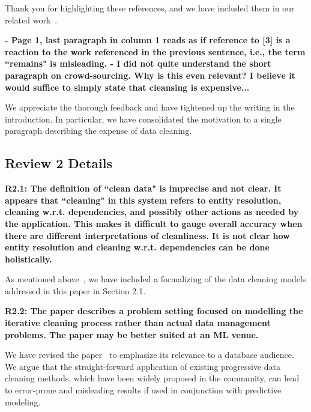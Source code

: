 Thank you for highlighting these references, and we have included them in our related work~.

\vspace{0.5em}

\noindent\textbf{- Page 1, last paragraph in column 1 reads as if reference to [3] is a reaction to the work referenced in the previous sentence, i.e., the term ``remains" is misleading.
- I did not quite understand the short paragraph on crowd-sourcing. Why is this even relevant?
 I believe it would suffice to simply state that cleansing is expensive...}

We appreciate the thorough feedback and have tightened up the writing in the introduction. In particular, we have consolidated the motivation to a single paragraph describing the expense of data cleaning.


\subsection*{Review 2 Details}

\noindent\textbf{R2.1: The definition of ``clean data" is imprecise and not clear. It appears that ``cleaning" in this system refers to entity resolution, cleaning w.r.t. dependencies, and possibly other actions as needed by the application. This makes it difficult to gauge overall accuracy when there are different interpretations of cleanliness. It is not clear how entity resolution and cleaning w.r.t. dependencies can be done holistically.}

As mentioned above~, we have included a formalizing of the data cleaning models addressed in this paper in Section 2.1. 

\vspace{0.5em}

\noindent\textbf{R2.2: The paper describes a problem setting focused on modelling the iterative cleaning process rather than actual data management problems. The paper may be better suited at an ML venue.}

We have revised the paper~ to emphasize its relevance to a database audience. We argue that the straight-forward application of existing progressive data cleaning methods, which have been widely proposed in the community, can lead to error-prone and misleading results if used in conjunction with predictive modeling. 

\vspace{0.5em}

